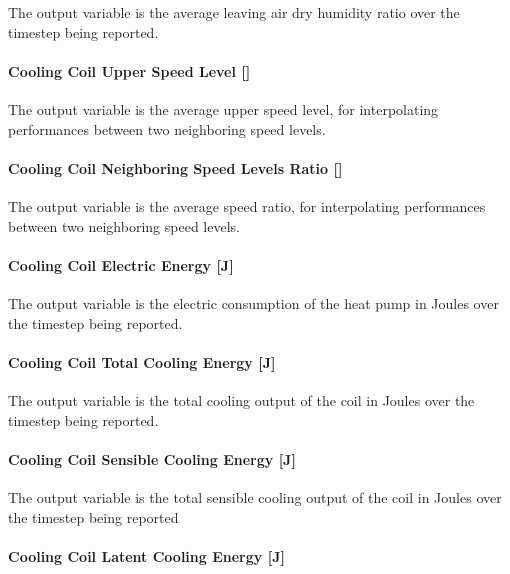 The output variable is the average leaving air dry humidity ratio over the timestep being reported.

\paragraph{\texorpdfstring{Cooling Coil Upper Speed Level {[]}}{Cooling Coil Upper Speed Level }}\label{cooling-coil-upper-speed-level}

The output variable is the average upper speed level, for interpolating performances between two neighboring speed levels.

\paragraph{\texorpdfstring{Cooling Coil Neighboring Speed Levels Ratio {[]}}{Cooling Coil Neighboring Speed Levels Ratio }}\label{cooling-coil-neighboring-speed-levels-ratio}

The output variable is the average speed ratio, for interpolating performances between two neighboring speed levels.

\paragraph{Cooling Coil Electric Energy {[}J{]}}\label{cooling-coil-electric-energy-j-1}

The output variable is the electric consumption of the heat pump in Joules over the timestep being reported.

\paragraph{Cooling Coil Total Cooling Energy {[}J{]}}\label{cooling-coil-total-cooling-energy-j-5}

The output variable is the total cooling output of the coil in Joules over the timestep being reported.

\paragraph{Cooling Coil Sensible Cooling Energy {[}J{]}}\label{cooling-coil-sensible-cooling-energy-j-5}

The output variable is the total sensible cooling output of the coil in Joules over the timestep being reported

\paragraph{Cooling Coil Latent Cooling Energy {[}J{]}}\label{cooling-coil-latent-cooling-energy-j-3}

